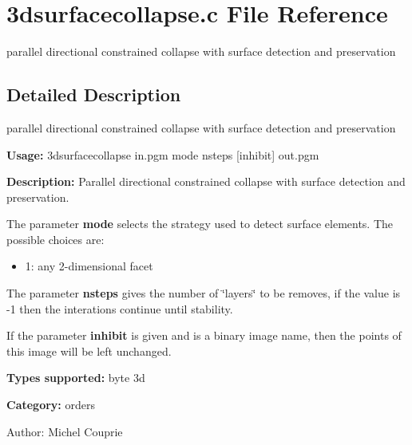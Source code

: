 \section{3dsurfacecollapse.c File Reference}
\label{3dsurfacecollapse_8c}
parallel directional constrained collapse with surface detection and preservation  




\label{_details}
\subsection{Detailed Description}
parallel directional constrained collapse with surface detection and preservation 

{\bf Usage:} 3dsurfacecollapse in.pgm mode nsteps [inhibit] out.pgm

{\bf Description:} Parallel directional constrained collapse with surface detection and preservation.

The parameter {\bf mode} selects the strategy used to detect surface elements. The possible choices are: \begin{itemize}
\item 1: any 2-dimensional facet\end{itemize}
The parameter {\bf nsteps} gives the number of \char`\"{}layers\char`\"{} to be removes, if the value is -1 then the interations continue until stability.

If the parameter {\bf inhibit} is given and is a binary image name, then the points of this image will be left unchanged.

{\bf Types supported:} byte 3d

{\bf Category:} orders

\begin{Desc}
\item[Author:]Michel Couprie \end{Desc}
